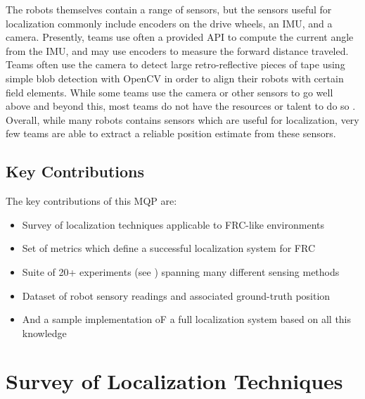 \documentclass{article}
\newcommand{\Newnameref}[1]{\textit{\nameref{#1}}}
\begin{document}
    The robots themselves contain a range of sensors, but the sensors useful for localization commonly include encoders on the drive wheels, an IMU, and a camera. Presently, teams use often a provided API to compute the current angle from the IMU, and may use encoders to measure the forward distance traveled. Teams often use the camera to detect large retro-reflective pieces of tape using simple blob detection with OpenCV in order to align their robots with certain field elements. While some teams use the camera or other sensors to go well above and beyond this, most teams do not have the resources or talent to do so \cite{balaji_zebravision_2017}. Overall, while many robots contains sensors which are useful for localization, very few teams are able to extract a reliable position estimate from these sensors.

  \subsection{Key Contributions}

    The key contributions of this MQP are:
    \begin{itemize}
      \item Survey of localization techniques applicable to FRC-like environments
      \item Set of metrics which define a successful localization system for FRC
      \item Suite of 20+ experiments (see \Newnameref{section:experiments}) spanning many different sensing methods
      \item Dataset of robot sensory readings and associated ground-truth position
      \item And a sample implementation oF a full localization system based on all this knowledge
    \end{itemize}

\tableofcontents




\section{Survey of Localization Techniques} \label{section:related_work}
\end{document}
